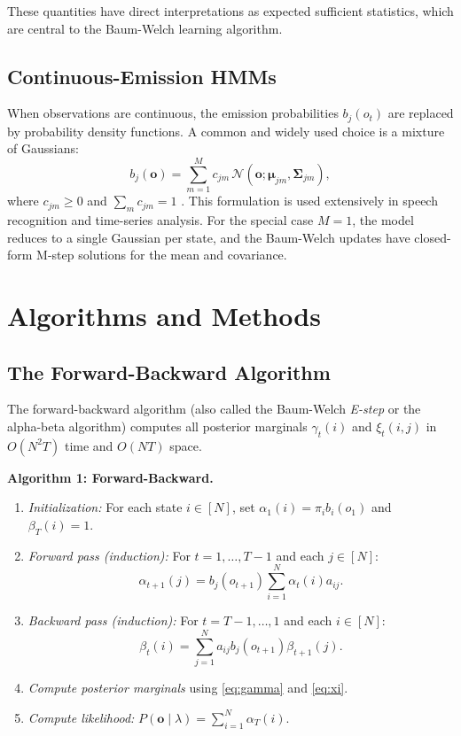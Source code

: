\documentclass[conference]{IEEEtran}
\begin{document}
These quantities have direct interpretations as expected sufficient statistics, which are central to the Baum-Welch learning algorithm.

\subsection{Continuous-Emission HMMs}

When observations are continuous, the emission probabilities $b_j(o_t)$ are replaced by probability density functions. A common and widely used choice is a mixture of Gaussians:
\begin{equation}
b_j(\mathbf{o}) = \sum_{m=1}^{M} c_{jm} \, \mathcal{N}(\mathbf{o}; \boldsymbol{\mu}_{jm}, \boldsymbol{\Sigma}_{jm}),
\label{eq:gmm_emission}
\end{equation}
where $c_{jm} \geq 0$ and $\sum_m c_{jm} = 1$ \cite{rabiner1989tutorial}. This formulation is used extensively in speech recognition and time-series analysis. For the special case $M = 1$, the model reduces to a single Gaussian per state, and the Baum-Welch updates have closed-form M-step solutions for the mean and covariance.

\section{Algorithms and Methods}
\label{sec:algorithms}

\subsection{The Forward-Backward Algorithm}

The forward-backward algorithm (also called the Baum-Welch \emph{E-step} or the alpha-beta algorithm) computes all posterior marginals $\gamma_t(i)$ and $\xi_t(i,j)$ in $O(N^2 T)$ time and $O(NT)$ space.

\textbf{Algorithm 1: Forward-Backward.}
\begin{enumerate}
  \item \textit{Initialization:} For each state $i \in [N]$, set $\alpha_1(i) = \pi_i b_i(o_1)$ and $\beta_T(i) = 1$.
  \item \textit{Forward pass (induction):} For $t = 1, \ldots, T-1$ and each $j \in [N]$:
  \begin{equation}
  \alpha_{t+1}(j) = b_j(o_{t+1}) \sum_{i=1}^{N} \alpha_t(i) a_{ij}.
  \end{equation}
  \item \textit{Backward pass (induction):} For $t = T-1, \ldots, 1$ and each $i \in [N]$:
  \begin{equation}
  \beta_t(i) = \sum_{j=1}^{N} a_{ij} b_j(o_{t+1}) \beta_{t+1}(j).
  \end{equation}
  \item \textit{Compute posterior marginals} using \eqref{eq:gamma} and \eqref{eq:xi}.
  \item \textit{Compute likelihood:} $P(\mathbf{o} \mid \lambda) = \sum_{i=1}^{N} \alpha_T(i)$.
\end{enumerate}
\end{document}
